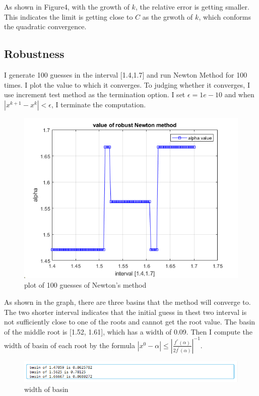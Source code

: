 \documentclass[a4paper]{article}
\begin{document}
As shown in Figure4, with the growth of $k$, the relative error is getting smaller. This indicates the limit is getting close to $C$ as the grwoth of $k$, which conforms the quadratic convergence.

\subsection{Robustness}
I generate 100 guesses in the interval [1.4,1.7] and run Newton Method for 100 times. I plot the value to which it converges. To judging whether it converges, I use increment test  method as the termination option. I set $\epsilon = 1e-10$ and when $|x^{k+1} - x^{k}| < \epsilon$, I terminate the computation. 

\begin{figure}[H] 
\centering 
\includegraphics[width=1.0\textwidth]{1.3-1.png}
\caption{plot of 100 guesses of Newton's method} 
\label{Fig.1.3-1} 
\end{figure}

As shown in the graph, there are three basins that the method will converge to. The two shorter interval indicates that the initial guess in thest two interval is not sufficiently close to one of the roots and cannot get the root value. The basin of the middle root is [1.52, 1.61], which has a width of 0.09. Then I compute the width of basin of each root by the formula $|x^{0}-\alpha |\leq \left| \frac{f^{''}(\alpha)}{2f^{'}(\alpha)} \right|^{-1}$.

\begin{figure}[H] 
\centering 
\includegraphics[width=1.0\textwidth]{1.3-2.png}
\caption{width of basin} 
\label{Fig.1.3-2} 
\end{figure}
\end{document}
